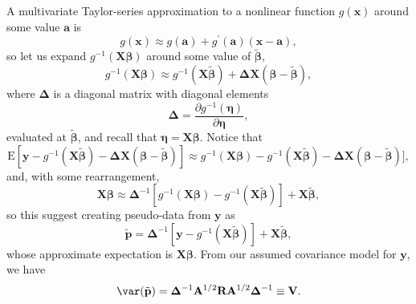 \documentclass[12pt, titlepage]{article}
\begin{document}
A multivariate Taylor-series approximation to a nonlinear function $g(\mathbf{x})$ around some value $\mathbf{a}$ is
$$
g(\mathbf{x}) \approx g(\mathbf{a}) + g^{\prime}(\mathbf{a})(\mathbf{x} - \mathbf{a}),
$$
so let us expand $g^{-1}(\mathbf{X}\boldsymbol{\beta})$ around some value of $\tilde{\boldsymbol{\beta}}$,
$$
g^{-1}(\mathbf{\mathbf{X}\boldsymbol{\beta}}) \approx g^{-1}(\mathbf{X}\tilde{\boldsymbol{\beta}}) + \boldsymbol{\Delta}\mathbf{X}(\boldsymbol{\beta} - \tilde{\boldsymbol{\beta}}),
$$
where $\boldsymbol{\Delta}$ is a diagonal matrix with diagonal elements
$$
\boldsymbol{\Delta} = \frac{\partial g^{-1}(\boldsymbol{\eta})}{\partial \boldsymbol{\eta}},
$$
evaluated at $\tilde{\boldsymbol{\beta}}$, and recall that $\boldsymbol{\eta} = \mathbf{X}\boldsymbol{\beta}$.  Notice that
$$
\textrm{E}[\mathbf{y} - g^{-1}(\mathbf{X}\tilde{\boldsymbol{\beta}}) - \boldsymbol{\Delta}\mathbf{X}(\boldsymbol{\beta} - \tilde{\boldsymbol{\beta}})] \approx g^{-1}(\mathbf{X}\boldsymbol{\beta}) - g^{-1}(\mathbf{X}\tilde{\boldsymbol{\beta}}) - \boldsymbol{\Delta}\mathbf{X}(\boldsymbol{\beta} - \tilde{\boldsymbol{\beta}})],
$$
and, with some rearrangement,
$$
\mathbf{X}\boldsymbol{\beta} \approx \boldsymbol{\Delta}^{-1}[g^{-1}(\mathbf{X}\boldsymbol{\beta}) - g^{-1}(\mathbf{X}\tilde{\boldsymbol{\beta}})] + \mathbf{X}\tilde{\boldsymbol{\beta}},
$$
so this suggest creating pseudo-data from $\mathbf{y}$ as
\begin{equation} \label{eq:pseudodata}
\tilde{\mathbf{p}} = \boldsymbol{\Delta}^{-1}[\mathbf{y} - g^{-1}(\mathbf{X}\tilde{\boldsymbol{\beta}})] + \mathbf{X}\tilde{\boldsymbol{\beta}},
\end{equation}
whose approximate expectation is $\mathbf{X}\boldsymbol{\beta}$.  From our assumed covariance model for $\mathbf{y}$, we have 
$$
\var({\tilde{\mathbf{p}}}) = \boldsymbol{\Delta}^{-1}\mathbf{A}^{1/2}\mathbf{R}\mathbf{A}^{1/2}\boldsymbol{\Delta}^{-1} \equiv \mathbf{V}.
$$
\end{document}
